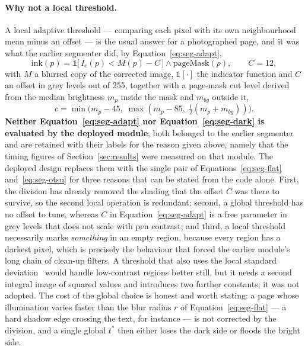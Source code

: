 \paragraph{Why not a local threshold.}
A local adaptive threshold --- comparing each pixel with its own neighbourhood mean minus an offset --- is the usual answer for a photographed page, and it was what the earlier segmenter did, by Equation~\ref{eq:seg-adapt},
\begin{equation}
\mathrm{ink}(p)=\mathbb 1\bigl[\,I_{\mathrm c}(p)<M(p)-C\,\bigr]\wedge\mathrm{pageMask}(p),\qquad C=12,
\label{eq:seg-adapt}
\end{equation}
with $M$ a blurred copy of the corrected image, $\mathbb 1[\cdot]$ the indicator function and $C$ an offset in grey levels out of 255, together with a page-mask cut level derived from the median brightness $m_p$ inside the mask and $m_{bg}$ outside it,
\begin{equation}
c=\min\!\bigl(m_p-45,\;\max(m_p-85,\;\tfrac12(m_p+m_{bg}))\bigr).
\label{eq:seg-dark}
\end{equation}
\textbf{Neither Equation~\ref{eq:seg-adapt} nor Equation~\ref{eq:seg-dark} is evaluated by the deployed module}; both belonged to the earlier segmenter and are retained with their labels for the reason given above, namely that the timing figures of Section~\ref{sec:results} were measured on that module.
The deployed design replaces them with the single pair of Equations~\ref{eq:seg-flat} and~\ref{eq:seg-otsu} for three reasons that can be stated from the code alone.
First, the division has already removed the shading that the offset $C$ was there to survive, so the second local operation is redundant; second, a global threshold has no offset to tune, whereas $C$ in Equation~\ref{eq:seg-adapt} is a free parameter in grey levels that does not scale with pen contrast; and third, a local threshold necessarily marks \emph{something} in an empty region, because every region has a darkest pixel, which is precisely the behaviour that forced the earlier module's long chain of clean-up filters.
A threshold that also uses the local standard deviation~\cite{sauvola2000} would handle low-contrast regions better still, but it needs a second integral image of squared values and introduces two further constants; it was not adopted.
The cost of the global choice is honest and worth stating: a page whose illumination varies faster than the blur radius $r$ of Equation~\ref{eq:seg-flat} --- a hard shadow edge crossing the text, for instance --- is not corrected by the division, and a single global $t^*$ then either loses the dark side or floods the bright side.

